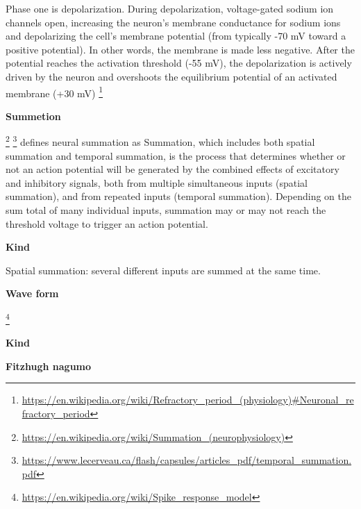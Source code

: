 \documentclass{book}
\providecommand{\ProjectDeepHeading}[2]{%
    \par\medskip\noindent\textbf{#2}\par\smallskip
}
\providecommand{\seeherefooter}[1]{\footnote{\url{#1}}}
\begin{document}

Phase one is depolarization. During depolarization, voltage-gated sodium ion channels open, increasing the neuron's membrane conductance for sodium ions and depolarizing the cell's membrane potential (from typically -70 mV toward a positive potential). In other words, the membrane is made less negative. After the potential reaches the activation threshold (-55 mV), the depolarization is actively driven by the neuron and overshoots the equilibrium potential of an activated membrane (+30 mV) \seeherefooter{https://en.wikipedia.org/wiki/Refractory_period_(physiology)\#Neuronal_refractory_period}

\ProjectDeepHeading{6}{Summetion}


\seeherefooter{https://en.wikipedia.org/wiki/Summation_(neurophysiology)}
    \seeherefooter{https://www.lecerveau.ca/flash/capsules/articles_pdf/temporal_summation.pdf} defines neural summation as Summation, which includes both spatial summation and temporal summation, is the process that determines whether or not an action potential will be generated by the combined effects of excitatory and inhibitory signals, both from multiple simultaneous inputs (spatial summation), and from repeated inputs (temporal summation). Depending on the sum total of many individual inputs, summation may or may not reach the threshold voltage to trigger an action potential.

\ProjectDeepHeading{7}{Kind}


Spatial summation: several different inputs are summed at the same time.

\ProjectDeepHeading{6}{Wave form}


\seeherefooter{https://en.wikipedia.org/wiki/Spike_response_model}

\ProjectDeepHeading{7}{Kind}

\ProjectDeepHeading{8}{Fitzhugh nagumo}
\end{document}
